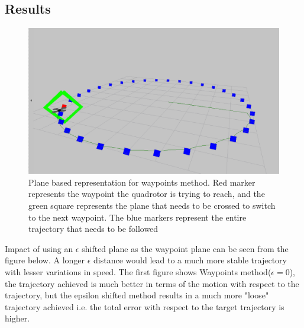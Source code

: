 \documentclass[hidelinks,BTech]{iitmdiss}
\begin{document}
\subsection{Results}
\begin{figure}[H]
  \centering
    \includegraphics[width=\textwidth]{Waypoints_plane.png}
    \caption{Plane based representation for waypoints method. Red marker represents the waypoint the quadrotor is trying to reach, and the green square represents the plane that needs to be crossed to switch to the next waypoint. The blue markers represent the entire trajectory that needs to be followed}
\end{figure}

Impact of using an $\epsilon$ shifted plane as the waypoint plane can be seen from the figure below. A longer $\epsilon$ distance would lead to a much more stable trajectory with lesser variations in speed. The first figure shows Waypoints method($\epsilon=0$), the trajectory achieved is much better in terms of the motion with respect to the trajectory, but the epsilon shifted method results in a much more "loose" trajectory achieved i.e. the total error with respect to the target trajectory is higher. 
\end{document}
